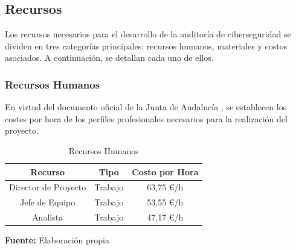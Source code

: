 \documentclass[a4paper, 11pt]{article}
\begin{document}
\par\vspace{0.5cm}



\subsection{Recursos}
\par\vspace{0.5cm}

Los recursos necesarios para el desarrollo de la auditoría de ciberseguridad se dividen en tres categorías principales: recursos humanos, materiales y costos asociados. A continuación, se detallan cada uno de ellos.
\par\vspace{0.5cm}

\subsubsection{Recursos Humanos}
\par\vspace{0.5cm}

En virtud del documento oficial de la Junta de Andalucía \cite{junta-perfiles}, se establecen los costes por hora de los perfiles profesionales necesarios para la realización del proyecto.
\par\vspace{0.5cm}

\begin{table}[H]
\caption{Recursos Humanos}
\centering
\renewcommand{\arraystretch}{1.5}
\begin{tabular}{|c|c|c|}
\hline
\textbf{Recurso} & \textbf{Tipo} & \textbf{Costo por Hora}  \\ \hline
Director de Proyecto & Trabajo & 63,75 €/h  \\ \hline
Jefe de Equipo & Trabajo & 53,55 €/h  \\ \hline
Analista & Trabajo & 47,17 €/h  \\ \hline
\end{tabular}
\begin{flushleft}\centering
    \footnotesize \textbf{Fuente:} Elaboración propia
\end{flushleft}   
\label{tab:recursos_humanos}
\end{table}
\end{document}

